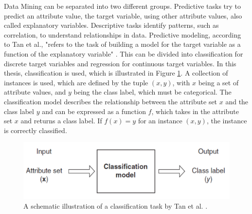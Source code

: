 Data Mining can be separated into two different groups. Predictive tasks try to predict an attribute value, the target variable, using other attribute values, also called explanatory variables. Descriptive tasks identify patterns, such as correlation, to understand relationships in data. Predictive modeling, according to Tan et al., "refers to the task of building a model for the target variable as a function of the explanatory variable" \cite[p.~29]{DBLP:books/aw/TanSKK2019}. This can be divided into classification for discrete target variables and regression for continuous target variables. In this thesis, classification is used, which is illustrated in Figure \ref{fig:classifiation}. A collection of instances is used, which are defined by the tuple $(x,y)$, with $x$ being a set of attribute values, and $y$ being the class label, which must be categorical. The classification model describes the relationship between the attribute set $x$ and the class label $y$ and can be expressed as a function $f$, which takes in the attribute set $x$ and returns a class label. If $f(x) = y$ for an instance $(x,y)$, the instance is correctly classified.
\begin{figure}
    \centering
    \includegraphics[scale = 0.6]{Images/classification.png}
    \caption{A schematic illustration of a classification task by Tan et al. \cite[p.~134]{DBLP:books/aw/TanSKK2019}.}
    \label{fig:classifiation}
\end{figure}




